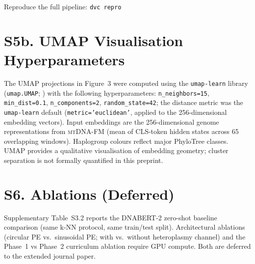 \documentclass[10pt]{article}
\newcommand{\mtdnafm}{\textsc{mtDNA-FM}\xspace}
\begin{document}
Reproduce the full pipeline: \texttt{dvc repro}

\section*{S5b. UMAP Visualisation Hyperparameters}

The UMAP projections in Figure~3 were computed using the \texttt{umap-learn} library
(\texttt{umap.UMAP}; \citealt{mcinnes2018umap}) with the following hyperparameters:
\texttt{n\_neighbors=15}, \texttt{min\_dist=0.1}, \texttt{n\_components=2},
\texttt{random\_state=42}; the distance metric was the \texttt{umap-learn} default
(\texttt{metric='euclidean'}, applied to the 256-dimensional embedding vectors).
Input embeddings are the 256-dimensional genome representations from \mtdnafm{}
(mean of CLS-token hidden states across 65 overlapping windows).
Haplogroup colours reflect major PhyloTree classes.
UMAP provides a qualitative visualisation of embedding geometry; cluster separation is not
formally quantified in this preprint.

\section*{S6. Ablations (Deferred)}

Supplementary Table~S3.2 reports the DNABERT-2 zero-shot baseline comparison (same k-NN
protocol, same train/test split). Architectural ablations (circular PE vs.\ sinusoidal PE;
with vs.\ without heteroplasmy channel) and the Phase~1 vs Phase~2 curriculum ablation require
GPU compute. Both are deferred to the extended journal paper.



\end{document}
